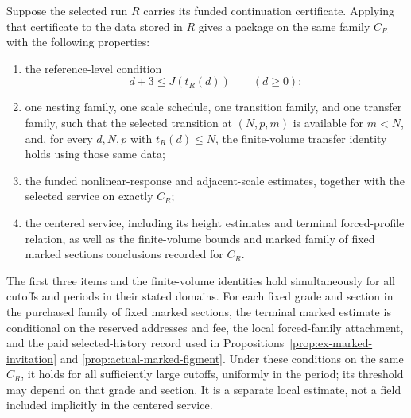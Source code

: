 \begin{proposition}
\label{prop:ex-original-history-attachment}
Suppose the selected run $R$ carries its funded continuation certificate.
Applying that certificate to the data stored in $R$ gives a package on the
same family $C_R$ with the following properties:
\begin{enumerate}
\item the reference-level condition
\[
 d+3\leq J(t_R(d))\qquad(d\geq0);
\]
\item one nesting family, one scale schedule, one transition family, and
   one transfer family, such that the selected transition at $(N,p,m)$ is
   available for $m<N$, and, for every $d,N,p$ with $t_R(d)\leq N$, the
   finite-volume transfer identity holds using those same data;
\item the funded nonlinear-response and adjacent-scale estimates, together
   with the selected service on exactly $C_R$;
\item the centered service, including its height estimates and terminal
   forced-profile relation, as well as the finite-volume bounds and marked
   family of fixed marked sections conclusions recorded for $C_R$.
\end{enumerate}
The first three items and the finite-volume identities hold simultaneously
for all cutoffs and periods in their stated domains. For each fixed grade
and section in the purchased family of fixed marked sections, the terminal marked estimate is
conditional on the reserved addresses and fee, the local forced-family
attachment, and the paid selected-history record used in Propositions~\ref{prop:ex-marked-invitation} and
\ref{prop:actual-marked-figment}. Under these conditions on the same
$C_R$, it holds for all sufficiently large cutoffs, uniformly in the period;
its threshold may depend on that grade and section. It is a separate local
estimate, not a field included implicitly in the centered service.
\end{proposition}

